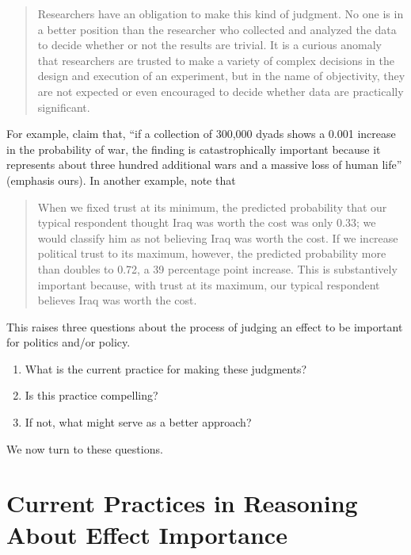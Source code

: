 \documentclass[12pt]{article}
\begin{document}
\begin{quote}
Researchers have an obligation to make this kind of judgment. No one is in a better position than the researcher who collected and analyzed the data to decide whether or not the results are trivial. It is a curious anomaly that researchers are trusted to make a variety of complex decisions in the design and execution of an experiment, but in the name of objectivity, they are not expected or even encouraged to decide whether data are practically significant.
\end{quote}

For example, \citet[p. 711]{KingZeng2001} claim that, ``if a collection of 300,000 dyads shows a 0.001 increase in the probability of war, the finding is catastrophically important because it represents about three hundred additional wars and a massive loss of human life'' (emphasis ours). In another example, \citet[p. 317]{HetheringtonSuhay2011} note that 
\begin{quote}
When we fixed trust at its minimum, the predicted probability that our typical respondent thought Iraq was worth the cost was only 0.33; we would classify him as not believing Iraq was worth the cost. If we increase political trust to its maximum, however, the predicted probability more than doubles to 0.72, a 39 percentage point increase. This is substantively important because, with trust at its maximum, our typical respondent believes Iraq was worth the cost.
\end{quote}
This raises three questions about the process of judging an effect to be important for politics and/or policy.
\begin{enumerate}
\item What is the current practice for making these judgments?
\item Is this practice compelling?
\item If not, what might serve as a better approach?
\end{enumerate}
\noindent We now turn to these questions.

\section*{Current Practices in Reasoning About Effect Importance}

\end{document}
